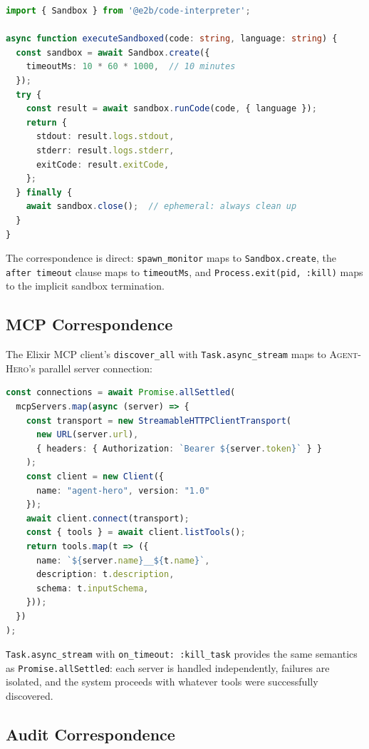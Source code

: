 \documentclass[12pt,a4paper]{article}
\theoremstyle{plain}
\theoremstyle{definition}
\newcommand{\agenthero}{\textsc{Agent-Hero}}
\begin{document}
\begin{lstlisting}[language=typescript, caption={E2B sandbox execution in Agent-Hero.}, label={lst:e2b}]
import { Sandbox } from '@e2b/code-interpreter';

async function executeSandboxed(code: string, language: string) {
  const sandbox = await Sandbox.create({
    timeoutMs: 10 * 60 * 1000,  // 10 minutes
  });
  try {
    const result = await sandbox.runCode(code, { language });
    return {
      stdout: result.logs.stdout,
      stderr: result.logs.stderr,
      exitCode: result.exitCode,
    };
  } finally {
    await sandbox.close();  // ephemeral: always clean up
  }
}
\end{lstlisting}

The correspondence is direct: \texttt{spawn\_monitor} maps to \texttt{Sandbox.create}, the \texttt{after timeout} clause maps to \texttt{timeoutMs}, and \texttt{Process.exit(pid, :kill)} maps to the implicit sandbox termination.

\subsection{MCP Correspondence}

The Elixir MCP client's \texttt{discover\_all} with \texttt{Task.async\_stream} maps to \agenthero{}'s parallel server connection:

\begin{lstlisting}[language=typescript, caption={Parallel MCP discovery in Agent-Hero.}, label={lst:ah-mcp}]
const connections = await Promise.allSettled(
  mcpServers.map(async (server) => {
    const transport = new StreamableHTTPClientTransport(
      new URL(server.url),
      { headers: { Authorization: `Bearer ${server.token}` } }
    );
    const client = new Client({
      name: "agent-hero", version: "1.0"
    });
    await client.connect(transport);
    const { tools } = await client.listTools();
    return tools.map(t => ({
      name: `${server.name}__${t.name}`,
      description: t.description,
      schema: t.inputSchema,
    }));
  })
);
\end{lstlisting}

\texttt{Task.async\_stream} with \texttt{on\_timeout: :kill\_task} provides the same semantics as \texttt{Promise.allSettled}: each server is handled independently, failures are isolated, and the system proceeds with whatever tools were successfully discovered.

\subsection{Audit Correspondence}
\end{document}
